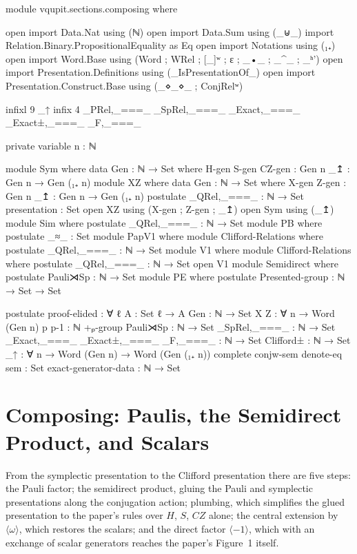 \begin{code}[hide]
module vqupit.sections.composing where

open import Data.Nat using (ℕ)
open import Data.Sum using (_⊎_)
import Relation.Binary.PropositionalEquality as Eq
open import Notations using (₁₊)
open import Word.Base using (Word ; WRel ; [_]ʷ ; ε ; _•_ ; _^_ ; _ʰ')
open import Presentation.Definitions using (_IsPresentationOf_)
open import Presentation.Construct.Base using (_⋄_⋄_ ; ConjRelʷ)

infixl 9 _↑
infix 4 _PRel,_===_ _SpRel,_===_ _Exact,_===_ _Exact±,_===_ _F,_===_

private variable
  n : ℕ

module Sym where
  data Gen : ℕ → Set where
    H-gen S-gen CZ-gen : Gen n
    _↥ : Gen n → Gen (₁₊ n)
module XZ where
  data Gen : ℕ → Set where
    X-gen Z-gen : Gen n
    _↥ : Gen n → Gen (₁₊ n)
  postulate
    _QRel,_===_ : ℕ → Set
    presentation : Set
open XZ using (X-gen ; Z-gen ; _↥)
open Sym using (_↥)
module Sim where
  postulate _QRel,_===_ : ℕ → Set
module PB where
  postulate _≈_ : Set
module PapV1 where
  module Clifford-Relations where
    postulate _QRel,_===_ : ℕ → Set
module V1 where
  module Clifford-Relations where
    postulate _QRel,_===_ : ℕ → Set
open V1
module Semidirect where
  postulate Pauli⋊Sp : ℕ → Set
module PE where
  postulate Presented-group : ℕ → Set → Set

postulate
  proof-elided : ∀ {ℓ} {A : Set ℓ} → A
  Gen : ℕ → Set
  X Z : ∀ {n} → Word (Gen n)
  p p-1 : ℕ
  +ₚ-group Pauli⋊Sp : ℕ → Set
  _SpRel,_===_ : ℕ → Set
  _Exact,_===_ _Exact±,_===_ _F,_===_ : ℕ → Set
  Clifford± : ℕ → Set
  _↑ : ∀ {n} → Word (Gen n) → Word (Gen (₁₊ n))
  complete conjw-sem denote-eq sem : Set
  exact-generator-data : ℕ → Set
\end{code}
\section{Composing: Paulis, the Semidirect Product, and Scalars}\label{sec:composing}

From the symplectic presentation to the Clifford presentation there are
five steps: the Pauli factor; the semidirect product, gluing the Pauli
and symplectic presentations along the conjugation action; plumbing,
which simplifies the glued presentation to the paper's rules over $H$,
$S$, $CZ$ alone; the central extension by $\langle\omega\rangle$,
which restores the scalars; and the direct factor $\langle -1\rangle$,
which with an exchange of scalar generators reaches the paper's
Figure~1 itself.

